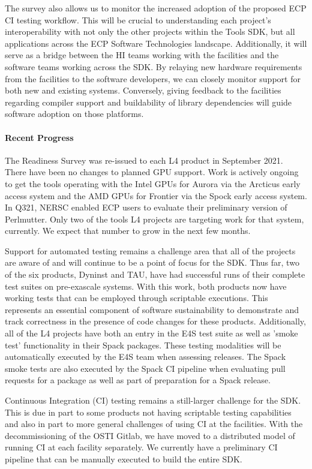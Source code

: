 The survey also allows us to monitor the increased adoption of the proposed ECP CI testing workflow. This will be crucial to understanding each project’s interoperability with not only the other projects within the Tools SDK, but all applications across the ECP Software Technologies landscape. Additionally, it will serve as a bridge between the HI teams working with the facilities and the software teams working across the SDK. By relaying new hardware requirements from the facilities to the software developers, we can closely monitor support for both new and existing systems. Conversely, giving feedback to the facilities regarding compiler support and buildability of library dependencies will guide software adoption on those platforms.

\paragraph{Recent Progress}
The Readiness Survey was re-issued to each L4 product in September 2021. There have been no changes to planned GPU support. Work is actively ongoing to get the tools operating with the Intel GPUs for Aurora via the Arcticus early access system and the AMD GPUs for Frontier via the Spock early access system. In Q321, NERSC enabled ECP users to evaluate their preliminary version of Perlmutter. Only two of the tools L4 projects are targeting work for that system, currently. We expect that number to grow in the next few months.

Support for automated testing remains a challenge area that all of the projects are aware of and will continue to be a point of focus for the SDK. Thus far, two of the six products, Dyninst and TAU, have had successful runs of their complete test suites on pre-exascale systems. With this work, both products now have working tests that can be employed through scriptable executions. This represents an essential component of software sustainability to demonstrate and track correctness in the presence of code changes for these products. Additionally, all of the L4 projects have both an entry in the E4S test suite as well as 'smoke test' functionality in their Spack packages. These testing modalities will be automatically executed by the E4S team when assessing releases. The Spack smoke tests are also executed by the Spack CI pipeline when evaluating pull requests for a package as well as part of preparation for a Spack release.

Continuous Integration (CI) testing remains a still-larger challenge for the SDK. This is due in part to some products not having scriptable testing capabilities and also in part to more general challenges of using CI at the facilities. With the decommissioning of the OSTI Gitlab, we have moved to a distributed model of running CI at each facility separately. We currently have a preliminary CI pipeline that can be manually executed to build the entire SDK.

